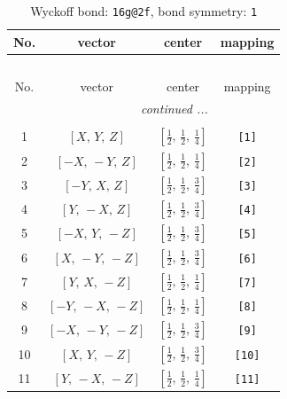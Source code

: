 \documentclass[fleqn,8pt]{jsarticle}
\begin{document}
\begin{longtable}{cccc}
\caption{Wyckoff bond: {\tt 16g@2f}, bond symmetry: {\tt 1}}
 \\
 \hline \hline
No. & vector & center & mapping \\ \hline \endfirsthead

\multicolumn{3}{l}{\tablename\ \thetable{}} \\
 \hline \hline
No. & vector & center & mapping \\ \hline \endhead

 \hline \hline
\multicolumn{3}{r}{\footnotesize\it continued ...} \\ \endfoot

 \hline \hline
\multicolumn{3}{r}{} \\ \endlastfoot

1 & $\left[ X,\, Y,\, Z \right]$ & $\left[ \frac{1}{2},\, \frac{1}{2},\, \frac{1}{4} \right]$ & {\tt [1]} \\ \hline
2 & $\left[ - X,\, - Y,\, Z \right]$ & $\left[ \frac{1}{2},\, \frac{1}{2},\, \frac{1}{4} \right]$ & {\tt [2]} \\ \hline
3 & $\left[ - Y,\, X,\, Z \right]$ & $\left[ \frac{1}{2},\, \frac{1}{2},\, \frac{3}{4} \right]$ & {\tt [3]} \\ \hline
4 & $\left[ Y,\, - X,\, Z \right]$ & $\left[ \frac{1}{2},\, \frac{1}{2},\, \frac{3}{4} \right]$ & {\tt [4]} \\ \hline
5 & $\left[ - X,\, Y,\, - Z \right]$ & $\left[ \frac{1}{2},\, \frac{1}{2},\, \frac{3}{4} \right]$ & {\tt [5]} \\ \hline
6 & $\left[ X,\, - Y,\, - Z \right]$ & $\left[ \frac{1}{2},\, \frac{1}{2},\, \frac{3}{4} \right]$ & {\tt [6]} \\ \hline
7 & $\left[ Y,\, X,\, - Z \right]$ & $\left[ \frac{1}{2},\, \frac{1}{2},\, \frac{1}{4} \right]$ & {\tt [7]} \\ \hline
8 & $\left[ - Y,\, - X,\, - Z \right]$ & $\left[ \frac{1}{2},\, \frac{1}{2},\, \frac{1}{4} \right]$ & {\tt [8]} \\ \hline
9 & $\left[ - X,\, - Y,\, - Z \right]$ & $\left[ \frac{1}{2},\, \frac{1}{2},\, \frac{3}{4} \right]$ & {\tt [9]} \\ \hline
10 & $\left[ X,\, Y,\, - Z \right]$ & $\left[ \frac{1}{2},\, \frac{1}{2},\, \frac{3}{4} \right]$ & {\tt [10]} \\ \hline
11 & $\left[ Y,\, - X,\, - Z \right]$ & $\left[ \frac{1}{2},\, \frac{1}{2},\, \frac{1}{4} \right]$ & {\tt [11]} \\ \hline

\end{longtable}
\end{document}
